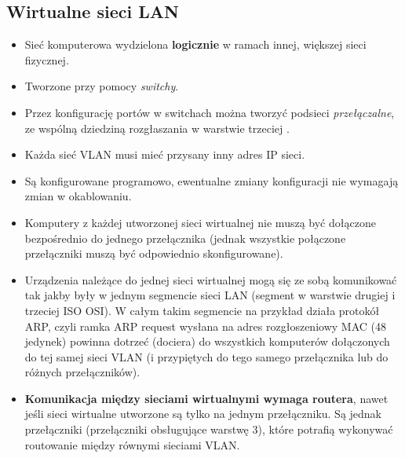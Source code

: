 \documentclass[../sk-egzamin.tex]{subfiles}
\begin{document}

\subsection*{Wirtualne sieci LAN}
\begin{itemize}
    \item Sieć komputerowa wydzielona \textbf{logicznie} w ramach innej,
    większej sieci fizycznej.

    \item Tworzone przy pomocy \textit{switchy}.

    \item Przez konfigurację portów w switchach można tworzyć podsieci
    \textit{przełączalne}, ze wspólną dziedziną rozgłaszania w warstwie trzeciej
    .

    \item Każda sieć VLAN musi mieć przysany inny adres IP sieci.

    \item Są konfigurowane programowo, ewentualne zmiany konfiguracji nie
    wymagają zmian w okablowaniu.

    \item Komputery z każdej utworzonej sieci wirtualnej nie muszą być dołączone
    bezpośrednio do jednego przełącznika (jednak wszystkie połączone
    przełączniki muszą być odpowiednio skonfigurowane).

    \item Urządzenia należące do jednej sieci wirtualnej mogą się ze sobą
    komunikować tak jakby były w jednym segmencie sieci LAN
    (segment w warstwie drugiej i trzeciej ISO OSI).
    W całym takim segmencie na przykład działa protokół ARP, czyli ramka ARP
    request wysłana na adres rozgłoszeniowy MAC (48 jedynek) powinna dotrzeć
    (dociera) do wszystkich komputerów dołączonych do tej samej sieci VLAN
    (i przypiętych do tego samego przełącznika lub do różnych przełączników).

    \item \textbf{Komunikacja między sieciami wirtualnymi wymaga routera},
    nawet jeśli sieci wirtualne utworzone są tylko na jednym przełączniku.
    Są jednak przełączniki (przełączniki obsługujące warstwę 3), które potrafią
    wykonywać routowanie między równymi sieciami VLAN.
\end{itemize}
\end{document}
